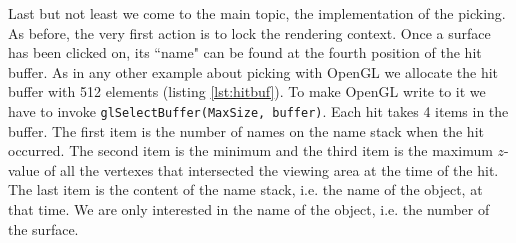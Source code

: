 \documentclass[jou,noapacite]{apa}
\begin{document}
Last but not least we come to the main topic, the implementation of the picking.
%
As before, the very first action is to lock the rendering context.
%
Once a surface has been clicked on, its ``name" can be found at the fourth
position of the hit buffer.
%
As in any other example about picking with OpenGL we allocate the hit buffer
with 512 elements (listing \ref{lst:hitbuf}).
%
To make OpenGL write to it we have to invoke \lstinline|glSelectBuffer(MaxSize, buffer)|.
Each hit takes 4 items in the buffer.
%
The first item is the number of names on the name stack when the hit occurred.
%
The second item is the minimum and the third item is the maximum $z$-value of
all the vertexes that intersected the viewing area at the time of the hit.
%
The last item is the content of the name stack, i.e. the name of the object,
at that time.
%
We are only interested in the name of the object, i.e. the number of the
surface.
\end{document}
